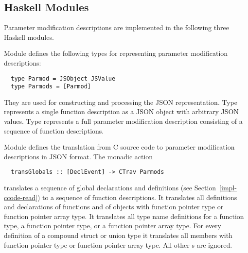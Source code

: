 \subsection{Haskell Modules}
\label{impl-parmod-modules}

Parameter modification descriptions are implemented in the following three Haskell modules.

Module  defines the following types for representing parameter modification descriptions:
\begin{verbatim}
  type Parmod = JSObject JSValue
  type Parmods = [Parmod]
\end{verbatim}
They are used for constructing and processing the JSON representation. Type  represents a single
function description as a JSON object with arbitrary JSON values. Type  represents a full parameter modification
description consisting of a sequence of function descriptions.

Module  defines the translation from C source code to parameter modification descriptions
in JSON format. The monadic action
\begin{verbatim}
  transGlobals :: [DeclEvent] -> CTrav Parmods
\end{verbatim}
translates a sequence of global declarations and definitions (see Section~\ref{impl-ccode-read}) to a sequence of
function descriptions. It translates all definitions and declarations of functions and of objects with function pointer
type or function pointer array type. It translates all type name definitions for a function type, a function pointer type, 
or a function pointer array type.
For every definition of a compound struct or union type it translates all members with function pointer type or function 
pointer array type.
All other s are ignored.

